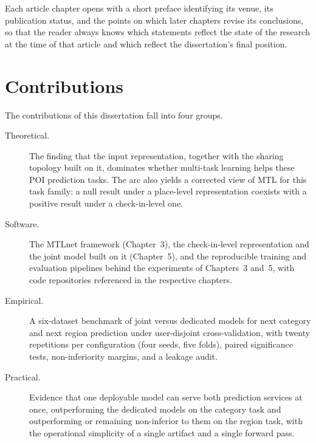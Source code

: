 Each article chapter opens with a short preface identifying its venue, its publication
status, and the points on which later chapters revise its conclusions, so that the
reader always knows which statements reflect the state of the research at the time of
that article and which reflect the dissertation's final position.

\section{Contributions}
\label{sec:intro:contributions}

The contributions of this dissertation fall into four groups.

\begin{description}
  \item[Theoretical.] The finding that the input representation, together with the
        sharing topology built on it, dominates whether multi-task learning helps
        these POI prediction tasks. The arc also yields a corrected view of MTL for
        this task family: a null result under a place-level representation coexists
        with a positive result under a check-in-level one.
  \item[Software.] The MTLnet framework (Chapter~3), the check-in-level
        representation and the joint model built on it (Chapter~5), and the
        reproducible training and evaluation pipelines behind the experiments of
        Chapters~3 and~5, with code repositories referenced in the respective
        chapters.
  \item[Empirical.] A six-dataset benchmark of joint versus dedicated models for next
        category and next region prediction under user-disjoint cross-validation,
        with twenty repetitions per configuration (four seeds, five folds), paired
        significance tests, non-inferiority margins, and a leakage audit.
  \item[Practical.] Evidence that one deployable model can serve both prediction
        services at once, outperforming the dedicated models on the category task and
        outperforming or remaining non-inferior to them on the region task, with the
        operational simplicity of a single artifact and a single forward pass.
\end{description}
